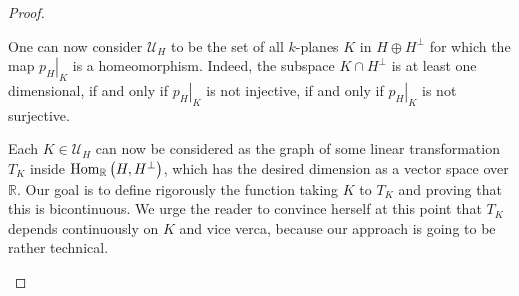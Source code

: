 \begin{proof}
\begin{b_item}
One can now consider $\mathcal{U}_H$ to be the set of all $k$-planes $K$ in $H\oplus H^{\perp}$ for which the map $\left.p_H\right|_{K}$ is a homeomorphism. Indeed, the subspace $K\cap H^{\perp}$ is at least one dimensional, if and only if $\left.p_H\right|_K$ is not injective, if and only if $\left.p_H\right|_K$ is not surjective.

Each $K\in\mathcal{U}_H$ can now be considered as the graph of some linear transformation $T_K$ inside $\mathrm{Hom}_{\mathbb{R}}\left(H,H^{\perp}\right)$, which has the desired dimension as a vector space over $\mathbb{R}$. Our goal is to define rigorously the function taking $K$ to $T_K$ and proving that this is bicontinuous. We urge the reader to convince herself at this point that $T_K$ depends continuously on $K$ and vice verca, because our approach is going to be rather technical.


\end{b_item}
\end{proof}
